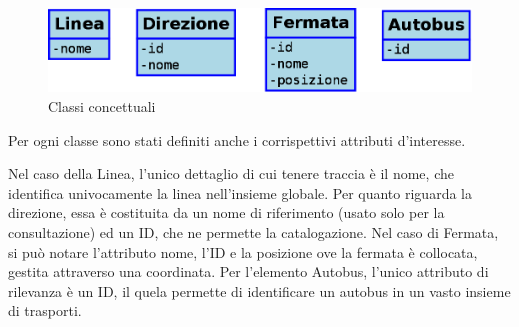 \vspace{1cm}
\begin{figure}[htbp]
\begin{center}
\includegraphics[width=12cm]{contents/images/classi_concettuali}
\end{center}
\caption{Classi concettuali}
\label{fig:classes}
\end{figure}

\newpage
Per ogni classe sono stati definiti anche i corrispettivi attributi d'interesse.

Nel caso della Linea, l'unico dettaglio di cui tenere traccia è il nome, che identifica univocamente la linea nell'insieme globale. Per quanto riguarda la direzione, essa è costituita da un nome di riferimento (usato solo per la consultazione) ed un ID, che ne permette la catalogazione.
Nel caso di Fermata, si può notare l'attributo nome, l'ID e la posizione ove la fermata è collocata, gestita attraverso una coordinata.
Per l'elemento Autobus, l'unico attributo di rilevanza è un ID, il quela permette di identificare un autobus in un vasto insieme di trasporti.

